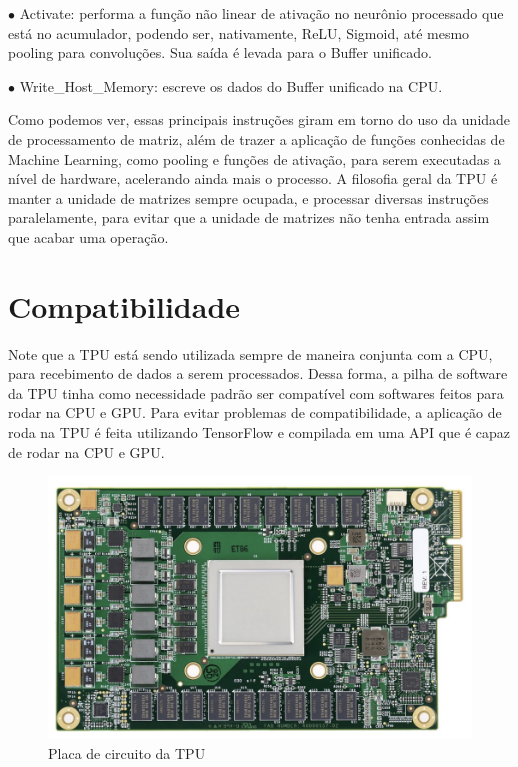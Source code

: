 \documentclass{report}
\begin{document}
$\bullet$ Activate: performa a função não linear de ativação no neurônio processado que está no acumulador, podendo ser, nativamente, ReLU, Sigmoid, até mesmo pooling para convoluções. Sua saída é levada para o Buffer unificado.

$\bullet$ Write\_Host\_Memory: escreve os dados do Buffer unificado na CPU.

Como podemos ver, essas principais instruções giram em torno do uso da unidade de processamento de matriz, além de trazer a aplicação de funções conhecidas de Machine Learning, como pooling e funções de ativação, para serem executadas a nível de hardware, acelerando ainda mais o processo. A filosofia geral da TPU é manter a unidade de matrizes sempre ocupada, e processar diversas instruções paralelamente, para evitar que a unidade de matrizes não tenha entrada assim que acabar uma operação.

\section{Compatibilidade}

Note que a TPU está sendo utilizada sempre de maneira conjunta com a CPU, para recebimento de dados a serem processados. Dessa forma, a pilha de software da TPU tinha como necessidade padrão ser compatível com softwares feitos para rodar na CPU e GPU. Para evitar problemas de compatibilidade, a aplicação de roda na TPU é feita utilizando TensorFlow e compilada em uma API que é capaz de rodar na CPU e GPU.

\begin{figure}[h]
	\includegraphics[scale=0.7]{circuit-board}
	\centering
	\caption{Placa de circuito da TPU}
\end{figure}
\end{document}
